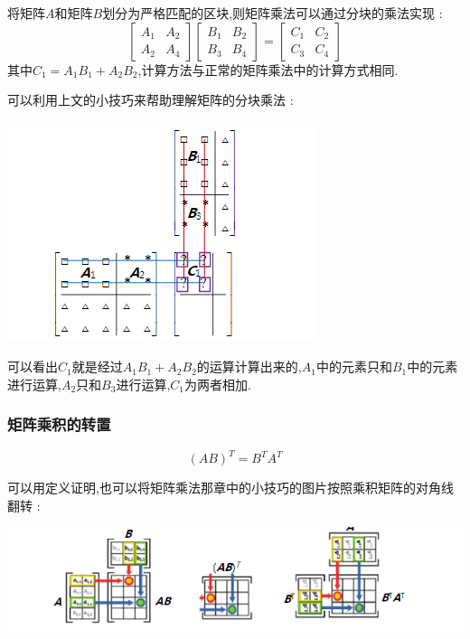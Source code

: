 \documentclass[UTF8,12pt]{ctexbook}
\newcommand{\transpose}{^T}
\begin{document}
{{{{{\begin{itemize}
{            将矩阵$A$和矩阵$B$划分为严格匹配的区块,则矩阵乘法可以通过分块的乘法实现 :
            $$
              \begin{bmatrix}
                A_1 & A_2 \\
                A_2 & A_4
              \end{bmatrix}
              \begin{bmatrix}
                B_1 & B_2 \\
                B_3 & B_4
              \end{bmatrix}
              =
              \begin{bmatrix}
                C_1 & C_2 \\
                C_3 & C_4
              \end{bmatrix}
            $$
            其中$C_1 = A_1B_1 + A_2B_2$,计算方法与正常的矩阵乘法中的计算方式相同.

            可以利用上文的小技巧来帮助理解矩阵的分块乘法 :

            \begin{center}
              \includegraphics{resources/MatrixMultiplecation_trick_2.png}
            \end{center}

            可以看出$C_1$就是经过$A_1B_1 + A_2B_2$的运算计算出来的,$A_1$中的元素只和$B_1$中的元素进行运算,$A_2$只和$B_3$进行运算,$C_1$为两者相加.
            }
    \end{itemize}
  }%

  \subsubsection{矩阵乘积的转置}{
    $$
      (AB)\transpose = B\transpose A\transpose
    $$

    可以用定义证明,也可以将矩阵乘法那章中的小技巧的图片按照乘积矩阵的对角线翻转 :
    \begin{center}
      \includegraphics{resources/theMultiplecationProductOfTranspose.png}
    \end{center}
  }%

}}}}
\end{document}
